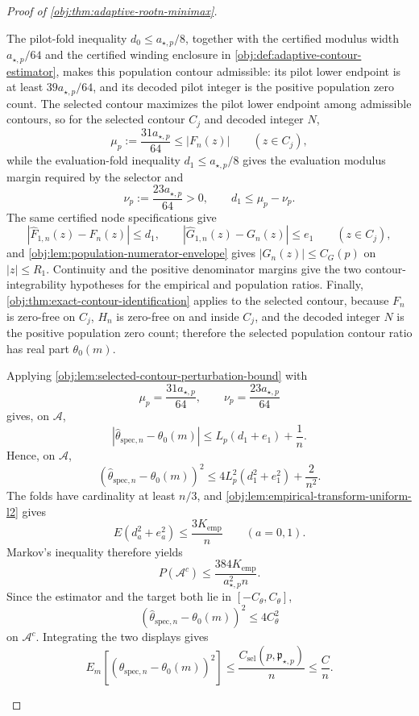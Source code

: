 \begin{proof}[Proof of \cref{obj:thm:adaptive-rootn-minimax}]
\begin{enumerate}
The pilot-fold inequality \(d_0\le a_{\star,p}/8\), together with the certified modulus width \(a_{\star,p}/64\) and the certified winding enclosure in \cref{obj:def:adaptive-contour-estimator}, makes this population contour admissible: its pilot lower endpoint is at least \(39a_{\star,p}/64\), and its decoded pilot integer is the positive population zero count.  The selected contour maximizes the pilot lower endpoint among admissible contours, so for the selected contour \(C_j\) and decoded integer \(N\),
\[
\mu_p:=\frac{31a_{\star,p}}{64}\le |F_n(z)|
\qquad (z\in C_j),
\]
while the evaluation-fold inequality \(d_1\le a_{\star,p}/8\) gives the evaluation modulus margin required by the selector and
\[
\nu_p:=\frac{23a_{\star,p}}{64}>0,
\qquad
 d_1\le \mu_p-\nu_p.
\]
The same certified node specifications give
\[
|\widehat F_{1,n}(z)-F_n(z)|\le d_1,
\qquad
|\widehat G_{1,n}(z)-G_n(z)|\le e_1
\qquad (z\in C_j),
\]
and \cref{obj:lem:population-numerator-envelope} gives \(|G_n(z)|\le C_G(p)\) on \(|z|\le R_1\).  Continuity and the positive denominator margins give the two contour-integrability hypotheses for the empirical and population ratios.  Finally, \cref{obj:thm:exact-contour-identification} applies to the selected contour, because \(F_n\) is zero-free on \(C_j\), \(H_n\) is zero-free on and inside \(C_j\), and the decoded integer \(N\) is the positive population zero count; therefore the selected population contour ratio has real part \(\theta_0(m)\).

Applying \cref{obj:lem:selected-contour-perturbation-bound} with
\[
\mu_p=\frac{31a_{\star,p}}{64},
\qquad
\nu_p=\frac{23a_{\star,p}}{64}
\]
gives, on \(\mathcal A\),
\[
|\widehat\theta_{\mathrm{spec},n}-\theta_0(m)|
\le
L_p(d_1+e_1)+\frac1n.
\]
Hence, on \(\mathcal A\),
\[
(\widehat\theta_{\mathrm{spec},n}-\theta_0(m))^2
\le
4L_p^2(d_1^2+e_1^2)+\frac{2}{n^2}.
\]
The folds have cardinality at least \(n/3\), and \cref{obj:lem:empirical-transform-uniform-l2} gives
\[
E(d_a^2+e_a^2)\le \frac{3K_{\mathrm{emp}}}{n}
\qquad(a=0,1).
\]
Markov's inequality therefore yields
\[
P(\mathcal A^c)
\le
\frac{384K_{\mathrm{emp}}}{a_{\star,p}^2n}.
\]
Since the estimator and the target both lie in \([-C_{\theta},C_{\theta}]\),
\[
(\widehat\theta_{\mathrm{spec},n}-\theta_0(m))^2\le 4C_{\theta}^2
\]
on \(\mathcal A^c\).  Integrating the two displays gives
\[
E_m\!\left[
(\widehat\theta_{\mathrm{spec},n}-\theta_0(m))^2
\right]
\le
\frac{C_{\mathrm{sel}}(p,\mathfrak p_{\star,p})}{n}
\le
\frac{C}{n}.
\] %


\end{enumerate}
\end{proof}
